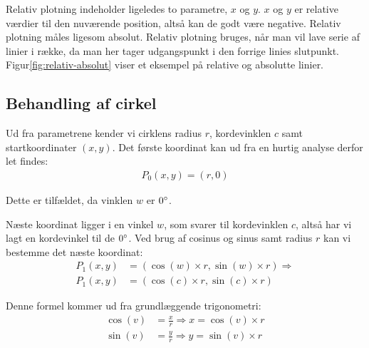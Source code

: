 Relativ plotning indeholder ligeledes to parametre, $x$ og $y$. $x$ og
$y$ er relative værdier til den nuværende position, altså kan de godt
være negative. Relativ plotning måles ligesom absolut. Relativ
plotning bruges, når man vil lave serie af linier i række, da man her
tager udgangspunkt i den forrige linies
slutpunkt. Figur\vref{fig:relativ-absolut} viser et eksempel på
relative og absolutte linier.

\subsection{Behandling af cirkel}
\label{sc:matematik-cirkel}

Ud fra parametrene kender vi cirklens radius $r$, kordevinklen $c$
samt startkoordinater $(x, y)$. Det første koordinat kan ud fra en
hurtig analyse derfor let findes:
\begin{align*}
  P_0(x, y) = (r, 0)
\end{align*}


Dette er tilfældet, da vinklen $w$ er $0^\circ$.

Næste koordinat ligger i en vinkel $w$, som svarer til kordevinklen
$c$, altså har vi lagt en kordevinkel til de $0^\circ$. Ved brug af
cosinus og sinus samt radius $r$ kan vi bestemme det næste koordinat:
\begin{align}
  P_1(x, y) &= \left( \cos(w) \times r, \sin(w) \times r \right) \Rightarrow \nonumber \\
  P_1(x, y) &= \left( \cos(c) \times r, \sin(c) \times r
  \right) \label{eq:8.1}
\end{align}
 
Denne formel kommer ud fra grundlæggende trigonometri:
\begin{align*}
  \cos(v) &= \frac{x}{r} \Rightarrow x = \cos(v)\times r \\
  \sin(v) &= \frac{y}{r} \Rightarrow y = \sin(v)\times r
\end{align*}
 
